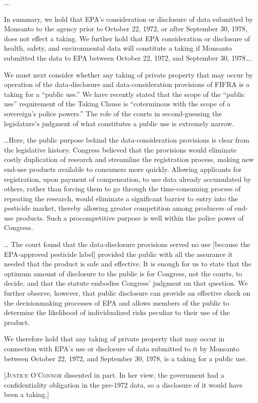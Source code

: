 \ldots.

In summary, we hold that EPA's consideration or disclosure of data submitted by
Monsanto to the agency prior to October 22, 1972, or after September 30, 1978,
does not effect a taking. We further hold that EPA consideration or disclosure
of health, safety, and environmental data will constitute a taking if Monsanto
submitted the data to EPA between October 22, 1972, and September 30,
1978\ldots.




We must next consider whether any taking of private property that may occur by
operation of the data-disclosure and data-consideration provisions of FIFRA is a
taking for a ``public use.'' We have recently stated that the scope of the
``public use'' requirement of the Taking Clause is ``coterminous with the scope
of a sovereign's police powers.''
The role of the courts in second-guessing the legislature's
judgment of what constitutes a public use is extremely narrow.

\ldots Here, the public purpose behind the data-consideration provisions
is clear from  the legislative history. Congress believed that the provisions
would eliminate costly duplication of research and streamline the registration
process, making new end-use products available to consumers more quickly.
Allowing applicants for registration, upon payment of compensation, to use data
already accumulated by others, rather than forcing them to go through the
time-consuming process of repeating the research, would eliminate a significant
barrier to entry into the pesticide market, thereby allowing greater competition
among producers of end-use products. Such a procompetitive
purpose is well within the police power of Congress.

\ldots
The court found that the
data-disclosure provisions served no use [because the EPA-approved pesticide
label] provided the public with all the assurance
it needed that the product is safe and effective.
It is enough for us to state that the optimum amount of disclosure to the
public is for Congress, not the courts, to decide, and that the statute embodies
Congress'  judgment on that question.
We further observe, however, that public disclosure can provide an
effective check on the decisionmaking processes of EPA and allows members of the
public to determine the likelihood of individualized risks peculiar to their use
of the product.

We therefore hold that any taking of private property that may occur in
connection with EPA's use or disclosure of data submitted to it by Monsanto
between October 22, 1972, and September 30, 1978, is a taking for a public use.

[\textsc{Justice O'Connor} dissented in part. In her view, the government had a
confidentiality obligation in the pre-1972 data, so a disclosure of it would
have been a taking.]

